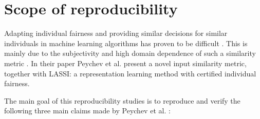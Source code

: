 \section{Scope of reproducibility}\label{sec:scope_of_rep}


Adapting individual fairness and providing similar decisions for similar individuals in machine learning algorithms has proven to be difficult \cite{dworkindfairness}. This is mainly due to the subjectivity and high domain dependence of such a similarity metric \cite{yurochkin2019training}. In their paper Peychev et al. \cite{peychev2022latent} present a novel input similarity metric, together with LASSI: a representation learning method with certified individual fairness. \newline

The main goal of this reproducibility studies is to reproduce and verify the following three main claims made by Peychev et al. \cite{peychev2022latent}:
 



